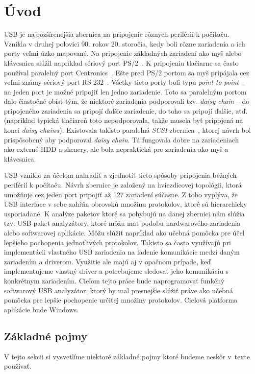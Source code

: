 \chapter{Úvod}

USB je najrozšírenejšia zbernica na pripojenie rôznych periférií k počítaču. Vznikla v druhej polovici 90. rokov 20. storočia, kedy boli rôzne zariadenia a ich porty veľmi úzko mapované. Na pripojenie základných zariadení ako myš alebo klávesnica slúžil napríklad sériový port PS/2~\cite{ps2_port}. K pripojeniu tlačiarne sa často používal paralelný port Centronics~\cite{parallel_port}. Ešte pred PS/2 portom sa myš pripájala cez veľmi známy sériový port RS-232~\cite{rs232_port}. Všetky tieto porty boli typu \textit{point-to-point} -- na jeden port je možné pripojiť len jedno zariadenie. Toto sa paralelným portom dalo čiastočné obísť tým, že niektoré zariadenia podporovali tzv. \textit{daisy chain} -- do pripojeného zariadenia sa pripojí ďalšie zariadenie, do toho sa pripojí ďalšie, atď. (napríklad typická tlačiareň toto nepodporovala, takže musela byť pripojená na konci \textit{daisy chainu}). Existovala takisto paralelná \textit{SCSI} zbernica~\cite{scsi_hub}, ktorej návrh bol prispôsobený aby podporoval  \textit{daisy chain}. Tá fungovala dobre na zariadeniach ako externé HDD a skenery, ale bola nepraktická pre zariadenia ako myš a klávesnica.

USB vzniklo za účelom nahradiť a zjednotiť tieto spôsoby pripojenia bežných periférií k počítaču. Návrh zbernice je založený na hviezdicovej topológii, ktorá umožňuje cez jeden port pripojiť až 127 zariadení súčasne. Z toho vyplýva, že USB interface v sebe zahŕňa obrovskú množinu protokolov, ktoré sú hierarchicky usporiadané. K analýze paketov ktoré sa pohybujú na danej zbernici nám slúžia tzv. USB paket analyzátory, ktoré môžu mať podobu hardwarového zariadenia alebo softwarovej aplikácie. Môžu slúžiť napríklad ako učebná pomôcka pre účel lepšieho pochopenia jednotlivých protokolov. Takisto sa často využívajú pri implementácii vlastného USB zariadenia na ladenie komunikácie medzi daným zariadením a driverom. Využitie ale majú aj v opačnom prípade, keď implementujeme vlastný driver a potrebujeme sledovať jeho komunikáciu s konkrétnym zariadením. Cieľom tejto práce bude naprogramovať funkčný softwarový USB analyzátor, ktorý by mal presnejšie slúžiť práve ako učebná pomôcka pre lepšie pochopenie určitej množiny protokolov. Cieľová platforma aplikácie bude Windows.

\section{Základné pojmy}
\label{uvod:sec:zakl_pojmy}
V tejto sekcii si vysvetlíme niektoré základné pojmy ktoré budeme neskôr v~texte používať.


